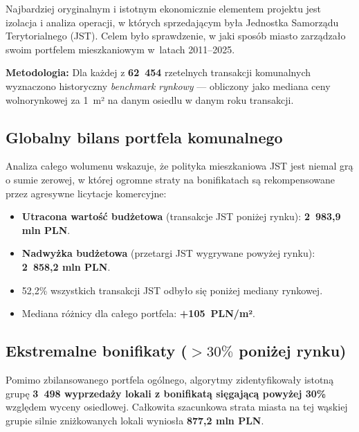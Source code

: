 \documentclass[12pt,a4paper]{article}
\begin{document}
Najbardziej oryginalnym i istotnym ekonomicznie elementem projektu jest izolacja i analiza operacji, w których sprzedającym była Jednostka Samorządu Terytorialnego (JST). Celem było sprawdzenie, w jaki sposób miasto zarządzało swoim portfelem mieszkaniowym w~latach 2011--2025.

\medskip\noindent
\textbf{Metodologia:} Dla każdej z \textbf{62~454} rzetelnych transakcji komunalnych wyznaczono historyczny \textit{benchmark rynkowy} --- obliczony jako mediana ceny wolnorynkowej za 1~m² na danym osiedlu w danym roku transakcji.

\subsection{Globalny bilans portfela komunalnego}

Analiza całego wolumenu wskazuje, że polityka mieszkaniowa JST jest niemal grą o sumie zerowej, w której ogromne straty na bonifikatach są rekompensowane przez agresywne licytacje komercyjne:
\begin{itemize}
  \item \textbf{Utracona wartość budżetowa} (transakcje JST poniżej rynku): \textbf{2~983,9 mln PLN}.
  \item \textbf{Nadwyżka budżetowa} (przetargi JST wygrywane powyżej rynku): \textbf{2~858,2 mln PLN}.
  \item 52,2\% wszystkich transakcji JST odbyło się poniżej mediany rynkowej.
  \item Mediana różnicy dla całego portfela: \textbf{+105~PLN/m²}.
\end{itemize}

\subsection{Ekstremalne bonifikaty ($>30\%$ poniżej rynku)}

Pomimo zbilansowanego portfela ogólnego, algorytmy zidentyfikowały istotną grupę \textbf{3~498 wyprzedaży lokali z bonifikatą sięgającą powyżej 30\%} względem wyceny osiedlowej. Całkowita szacunkowa strata miasta na tej wąskiej grupie silnie zniżkowanych lokali wyniosła \textbf{877,2 mln PLN}.
\end{document}

